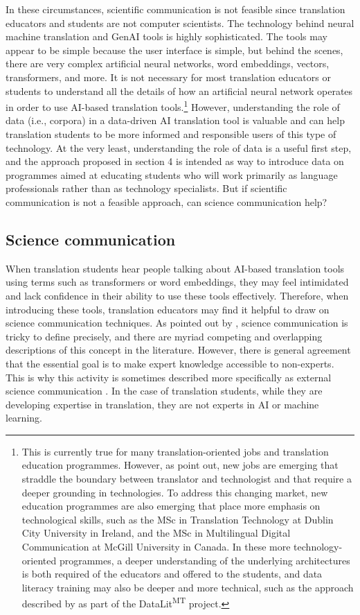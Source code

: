 \documentclass[output=paper]{langscibook}
\begin{document}
In these circumstances, scientific communication is not feasible since translation educators and students are not computer scientists. The technology behind neural machine translation and GenAI tools is highly sophisticated. The tools may appear to be simple because the user interface is simple, but behind the scenes, there are very complex artificial neural networks, word embeddings, vectors, transformers, and more. It is not necessary for most translation educators or students to understand all the details of how an artificial neural network operates in order to use AI-based translation tools.\footnote{This is currently true for many translation-oriented jobs and translation education programmes. However, as \citet{brivaiglesiasobrien22} point out, new jobs are emerging that straddle the boundary between translator and technologist and that require a deeper grounding in technologies. To address this changing market, new education programmes are also emerging that place more emphasis on technological skills, such as the MSc in Translation Technology at Dublin City University in Ireland, and the MSc in Multilingual Digital Communication at McGill University in Canada. In these more technology-oriented programmes, a deeper understanding of the underlying architectures is both required of the educators and offered to the students, and data literacy training may also be deeper and more technical, such as the approach described by \citet{hackenbucherkruger23} as part of the DataLit\textsuperscript{MT} project.} However, understanding the role of data (i.e., corpora) in a data-driven AI translation tool is valuable and can help translation students to be more informed and responsible users of this type of technology. At the very least, understanding the role of data is a useful first step, and the approach proposed in section 4 is intended as way to introduce data on programmes aimed at educating students who will work primarily as language professionals rather than as technology specialists. But if scientific communication is not a feasible approach, can science communication help?  

\subsection{Science communication}\label{sec:4:3.2}
When translation students hear people talking about AI-based translation tools using terms such as transformers or word embeddings, they may feel intimidated and lack confidence in their ability to use these tools effectively. Therefore, when introducing these tools, translation educators may find it helpful to draw on science communication techniques. As pointed out by \citet{burnsoconnor03}, science communication is tricky to define precisely, and there are myriad competing and overlapping descriptions of this concept in the literature. However, there is general agreement that the essential goal is to make expert knowledge accessible to non-experts. This is why this activity is sometimes described more specifically as external science communication \citep{hanauska19}. In the case of translation students, while they are developing expertise in translation, they are not experts in AI or machine learning.
\end{document}
